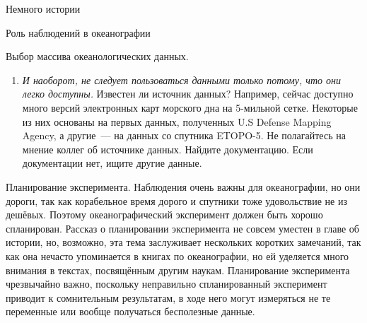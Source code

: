 \begin{chapter}{Немного истории}
\begin{section}{Роль наблюдений в океанографии}
\begin{paragraph}{Выбор массива океанологических данных.}
\begin{enumerate}
\item 
\emph{И наоборот, не следует пользоваться данными только потому, что они легко
доступны.} Известен ли источник данных? Например, сейчас доступно много
версий электронных карт морского дна на 5-мильной сетке. Некоторые из
них основаны на первых данных, полученных U.S Defense Mapping Agency, а
другие~--- на данных со спутника ETOPO-5. Не полагайтесь на
мнение коллег об источнике данных. Найдите документацию. Если
документации нет, ищите другие данные.
%
\end{enumerate}
\end{paragraph}


\begin{paragraph}{Планирование эксперимента.}
Наблюдения очень важны для океанографии, но
они дороги, так как корабельное время дорого и спутники тоже
удовольствие не из дешёвых. Поэтому океанографический эксперимент
должен быть хорошо спланирован. Рассказ о планировании эксперимента не
совсем уместен в главе об истории, но, возможно, эта тема заслуживает
нескольких коротких замечаний, так как она нечасто упоминается в книгах
по океанографии, но ей уделяется много внимания в текстах, посвящённым
другим наукам. Планирование эксперимента чрезвычайно важно, поскольку
неправильно спланированный эксперимент приводит к сомнительным
результатам, в ходе него могут измеряться не те переменные или вообще
получаться бесполезные данные.
%



\end{paragraph}
\end{section}
\end{chapter}
